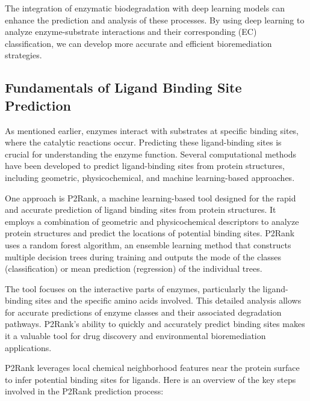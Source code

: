 The integration of enzymatic biodegradation with deep learning models can enhance the prediction and analysis of these processes. By using deep learning to analyze enzyme-substrate interactions and their corresponding (EC) classification, we can develop more accurate and efficient bioremediation strategies.

\subsection{Fundamentals of Ligand Binding Site Prediction}
\label{sec:Fundamentals of Ligand Binding Site Prediction}

As mentioned earlier, enzymes interact with substrates at specific binding sites, where the catalytic reactions occur. Predicting these ligand-binding sites is crucial for understanding the enzyme function. Several computational methods have been developed to predict ligand-binding sites from protein structures, including geometric, physicochemical, and machine learning-based approaches.

One approach is P2Rank, a machine learning-based tool designed for the rapid and accurate prediction of ligand binding sites from protein structures. It employs a combination of geometric and physicochemical descriptors to analyze protein structures and predict the locations of potential binding sites. P2Rank uses a random forest algorithm, an ensemble learning method that constructs multiple decision trees during training and outputs the mode of the classes (classification) or mean prediction (regression) of the individual trees.

The tool focuses on the interactive parts of enzymes, particularly the ligand-binding sites and the specific amino acids involved. This detailed analysis allows for accurate predictions of enzyme classes and their associated degradation pathways. P2Rank's ability to quickly and accurately predict binding sites makes it a valuable tool for drug discovery and environmental bioremediation applications.

P2Rank leverages local chemical neighborhood features near the protein surface to infer potential binding sites for ligands. Here is an overview of the key steps involved in the P2Rank prediction process:

